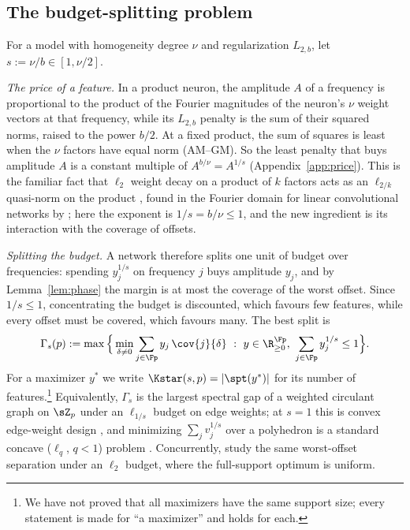 \subsection{The budget-splitting problem}\label{sec:programme}

For a model with homogeneity degree $\nu$ and regularization $L_{2,b}$, let $s:=\nu/b\in[1,\nu/2]$.

\emph{The price of a feature.} In a product neuron, the amplitude $A$ of a frequency is proportional to the product of the Fourier magnitudes of the neuron's $\nu$ weight vectors at that frequency, while its $L_{2,b}$ penalty is the sum of their squared norms, raised to the power $b/2$. At a fixed product, the sum of squares is least when the $\nu$ factors have equal norm (AM--GM). So the least penalty that buys amplitude $A$ is a constant multiple of $A^{b/\nu}=A^{1/s}$ (Appendix~\ref{app:price}). This is the familiar fact that $\ell_2$ weight decay on a product of $k$ factors acts as an $\ell_{2/k}$ quasi-norm on the product \citep{hoff2017lasso,tibshirani2021equivalences,dai2021representation,kolb2025deep}, found in the Fourier domain for linear convolutional networks by \citet{gunasekar2018implicit}; here the exponent is $1/s=b/\nu\le1$, and the new ingredient is its interaction with the coverage of offsets.

\emph{Splitting the budget.} A network therefore splits one unit of budget over frequencies: spending $y_j^{1/s}$ on frequency $j$ buys amplitude $y_j$, and by Lemma~\ref{lem:phase} the margin is at most the coverage of the worst offset. Since $1/s\le1$, concentrating the budget is discounted, which favours few features, while every offset must be covered, which favours many. The best split is
\begin{equation}
  \Gamma_s(p):=\max\Big\{\min_{\delta\neq0}\sum_{j\in\Fp}y_j\,\cov{j}{\delta}\ :\ y\in\R_{\ge0}^{\Fp},\ \sum_{j\in\Fp}y_j^{1/s}\le1\Big\}.
  \label{eq:programme}
\end{equation}
For a maximizer $y^*$ we write $\Kstar(s,p)=|\spt(y^*)|$ for its number of features.\footnote{We have not proved that all maximizers have the same support size; every statement is made for ``a maximizer'' and holds for each.} Equivalently, $\Gamma_s$ is the largest spectral gap of a weighted circulant graph on $\sZ_p$ under an $\ell_{1/s}$ budget on edge weights; at $s=1$ this is convex edge-weight design \citep{boyd2006convex,sun2006fastest}, and minimizing $\sum_jv_j^{1/s}$ over a polyhedron is a standard concave ($\ell_q$, $q<1$) problem \citep{ge2011note}. Concurrently, \citet{kam2026symmetry} study the same worst-offset separation under an $\ell_2$ budget, where the full-support optimum is uniform.

